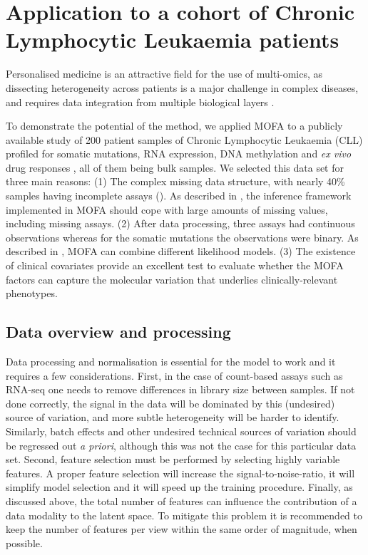 \newpage

\section{Application to a cohort of Chronic Lymphocytic Leukaemia patients} \label{section:mofa_cll}

Personalised medicine is an attractive field for the use of multi-omics, as dissecting heterogeneity across patients is a major challenge in complex diseases, and requires data integration from multiple biological layers \cite{Chen2013,Costello2014,Alyass2015}.

To demonstrate the potential of the method, we applied MOFA to a publicly available study of 200 patient samples of Chronic Lymphocytic Leukaemia (CLL) profiled for somatic mutations, RNA expression, DNA methylation and \textit{ex vivo} drug responses \cite{Dietrich2018}, all of them being bulk samples. We selected this data set for three main reasons: (1) The complex missing data structure, with nearly 40\% samples having incomplete assays (). As described in , the inference framework implemented in MOFA should cope with large amounts of missing values, including missing assays. (2) After data processing, three assays had continuous observations whereas for the somatic mutations the observations were binary. As described in , MOFA can combine different likelihood models. (3) The existence of clinical covariates provide an excellent test to evaluate whether the MOFA factors can capture the molecular variation that underlies clinically-relevant phenotypes.

\subsection{Data overview and processing}

Data processing and normalisation is essential for the model to work and it requires a few considerations. First, in the case of count-based assays such as RNA-seq one needs to remove differences in library size between samples. If not done correctly, the signal in the data will be dominated by this (undesired) source of variation, and more subtle heterogeneity will be harder to identify. Similarly, batch effects and other undesired technical sources of variation should be regressed out \textit{a priori}, although this was not the case for this particular data set. Second, feature selection must be performed by selecting highly variable features. A proper feature selection will increase the signal-to-noise-ratio, it will simplify model selection and it will speed up the training procedure.  Finally, as discussed above, the total number of features can influence the contribution of a data modality to the latent space. To mitigate this problem it is recommended to keep the number of features per view within the same order of magnitude, when possible.


